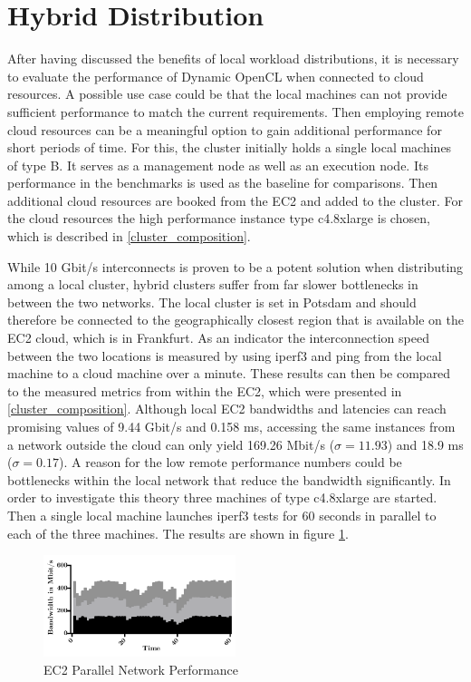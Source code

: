 \section{Hybrid Distribution}

After having discussed the benefits of local workload distributions, it is necessary to evaluate the performance of Dynamic OpenCL when connected to cloud resources. A possible use case could be that the local machines can not provide sufficient performance to match the current requirements. Then employing remote cloud resources can be a meaningful option to gain additional performance for short periods of time. For this, the cluster initially holds a single local machines of type B. It serves as a management node as well as an execution node. Its performance in the benchmarks is used as the baseline for comparisons. Then additional cloud resources are booked from the EC2 and added to the cluster. For the cloud resources the high performance instance type c4.8xlarge is chosen, which is described in \ref{cluster_composition}.

While 10 Gbit/s interconnects is proven to be a potent solution when distributing among a local cluster, hybrid clusters suffer from far slower bottlenecks in between the two networks. The local cluster is set in Potsdam and should therefore be connected to the geographically closest region that is available on the EC2 cloud, which is in Frankfurt. As an indicator the interconnection speed between the two locations is measured by using iperf3 and ping from the local machine to a cloud machine over a minute. These results can then be compared to the measured metrics from within the EC2, which were presented in \ref{cluster_composition}. Although local EC2 bandwidths and latencies can reach promising values of 9.44 Gbit/s and 0.158 ms, accessing the same instances from a network outside the cloud can only yield 169.26 Mbit/s ($\sigma = 11.93$) and 18.9 ms ($\sigma = 0.17$). A reason for the low remote performance numbers could be bottlenecks within the local network that reduce the bandwidth significantly. In order to investigate this theory three machines of type c4.8xlarge are started. Then a single local machine launches iperf3 tests for 60 seconds in parallel to each of the three machines. The results are shown in figure \ref{img:EC2 Parallel Network Performance}.

\begin{figure}[!htb]
	\includegraphics[width=0.5\textwidth]{images/ec2_stacked_network_performance.pdf}
	\centering
	\caption{EC2 Parallel Network Performance}
	\label{img:EC2 Parallel Network Performance}
\end{figure}

